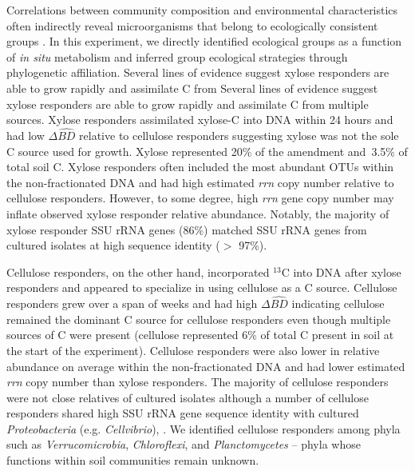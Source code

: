 Correlations between community composition and environmental characteristics
often indirectly reveal microorganisms that belong to ecologically consistent
groups \citep{Fierer2007}. In this experiment, we directly identified
ecological groups as a function of \textit{in situ} metabolism and inferred
group ecological strategies through phylogenetic affiliation. Several lines of
evidence suggest xylose responders are able to grow rapidly and assimilate
C from Several lines of evidence suggest xylose responders are able to grow
rapidly and assimilate C from multiple sources. Xylose responders assimilated
xylose-C into DNA within 24 hours and had low $\Delta\hat{BD}$ relative to
cellulose responders suggesting xylose was not the sole C source used for
growth. Xylose represented 20\% of the amendment and~3.5\% of total soil C.
Xylose responders often included the most abundant OTUs within the
non-fractionated DNA and had high estimated \textit{rrn} copy number relative
to cellulose responders. However, to some degree, high \textit{rrn} gene copy
number may inflate observed xylose responder relative abundance. Notably, the
majority of xylose responder SSU rRNA genes (86\%) matched SSU rRNA genes from
cultured isolates at high sequence identity ($>$ 97\%). 

Cellulose responders, on the other hand, incorporated $^{13}$C into DNA after
xylose responders and appeared to specialize in using cellulose as a C source.
Cellulose responders grew over a span of weeks and had high $\Delta\hat{BD}$
indicating cellulose remained the dominant C source for cellulose responders
even though multiple sources of C were present (cellulose represented 6\% of
total C present in soil at the start of the experiment). Cellulose responders
were also lower in relative abundance on average within the non-fractionated
DNA and had lower estimated \textit{rrn} copy number than xylose responders.
The majority of cellulose responders were not close relatives of cultured
isolates although a number of cellulose responders shared high SSU rRNA gene
sequence identity with cultured \textit{Proteobacteria} (e.g.
\textit{Cellvibrio}), . We identified cellulose responders among phyla such as
\textit{Verrucomicrobia}, \textit{Chloroflexi}, and \textit{Planctomycetes} --
phyla whose functions within soil communities remain unknown.

